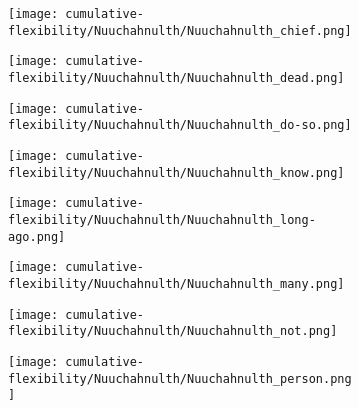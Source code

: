 \begin{figure}

  \caption{Cumulative flexibility of high-frequency lexical items in Nuuchahnulth}
  \label{fig:cumulative-flexibility-Nuuchahnulth-items}
  \centering

  \begin{subfigure}{0.5\linewidth}
    \centering
    \caption{ }
    \texttt{[image: cumulative-flexibility/Nuuchahnulth/Nuuchahnulth\_chief.png]}
  \end{subfigure}%
  \begin{subfigure}{0.5\linewidth}
    \centering
    \caption{ }
    \texttt{[image: cumulative-flexibility/Nuuchahnulth/Nuuchahnulth\_dead.png]}
  \end{subfigure}

  \begin{subfigure}{0.5\linewidth}
    \centering
    \caption{ }
    \texttt{[image: cumulative-flexibility/Nuuchahnulth/Nuuchahnulth\_do-so.png]}
  \end{subfigure}%
  \begin{subfigure}{0.5\linewidth}
    \centering
    \caption{ }
    \texttt{[image: cumulative-flexibility/Nuuchahnulth/Nuuchahnulth\_know.png]}
  \end{subfigure}

  \begin{subfigure}{0.5\linewidth}
    \centering
    \caption{ }
    \texttt{[image: cumulative-flexibility/Nuuchahnulth/Nuuchahnulth\_long-ago.png]}
  \end{subfigure}%
  \begin{subfigure}{0.5\linewidth}
    \centering
    \caption{ }
    \texttt{[image: cumulative-flexibility/Nuuchahnulth/Nuuchahnulth\_many.png]}
  \end{subfigure}

  \begin{subfigure}{0.5\linewidth}
    \centering
    \caption{ }
    \texttt{[image: cumulative-flexibility/Nuuchahnulth/Nuuchahnulth\_not.png]}
  \end{subfigure}%
  \begin{subfigure}{0.5\linewidth}
    \centering
    \caption{ }
    \texttt{[image: cumulative-flexibility/Nuuchahnulth/Nuuchahnulth\_person.png]}
  \end{subfigure}


\end{figure}
